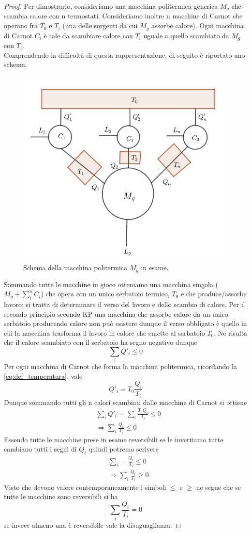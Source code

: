 \documentclass[10pt,a4paper]{article}
\newtheorem{proof}{Proposition}
\begin{document}
\begin{proof}
Per dimostrarlo, consideriamo una macchina politermica generica \(M_g\) che scambia calore con n termostati. Consideriamo inoltre n macchine di Carnot che operano fra \(T_0 \) e \(T_i\) (una delle sorgenti da cui \(M_g\) assorbe calore). Ogni macchina di Carnot \(C_i\) è tale da scambiare calore con \(T_i\) uguale a quello scambiato da \(M_g\) con \(T_i\).\\
Comprendendo la difficoltà di questa rappresentazione, di seguito è riportato uno schema.
\begin{figure}[h!]
	\centering
	\includegraphics[width=0.6\linewidth]{../images/macchina_polit}
	\caption{Schema della macchina politermica \(M_g\) in esame.}
	\label{fig:macchinapolit}
\end{figure}
\FloatBarrier
Sommando  tutte le macchine in gioco otteniamo una macchina singola (\(M_g+\sum_i^n C_i\)) che opera con un unico serbatoio termico, \(T_0\) e che produce/assorbe lavoro; si tratta di determinare il verso del lavoro e dello scambio di calore. Per il secondo principio secondo KP una macchina che assorbe calore da un unico serbatoio producendo calore non può esistere dunque il verso obbligato è quello in cui la macchina trasforma il lavoro in calore che emette al serbatoio \(T_0\). Ne risulta che il calore scambiato con il serbatoio ha segno negativo dunque 
\[\sum_i Q'_i \leq 0\]
Per ogni macchina di Carnot che forma la macchina politermica, ricordando la \ref{eq:def_temperatura}, vale 
\[Q'_i = T_0 \frac{Q_i}{T_i}\]
Dunque sommando tutti gli n calori scambiati dalle macchine di Carnot si ottiene
\begin{align*}
	&\sum_i Q'_i = \sum_i\frac{T_0 Q_i}{T_i}\leq 0\\
	&\Rightarrow \sum_i \frac{Q_i}{T_i}\leq 0
\end{align*}
Essendo tutte le macchine prese in esame reversibili se le invertiamo tutte cambiano tutti i segni di \(Q_i\) quindi potremo scrivere
\begin{align*}
	&\sum_i -\frac{Q_i}{T_i}\leq 0\\
	&\Rightarrow \sum_i \frac{Q_i}{T_i}\geq 0
\end{align*}
Visto che devono valere contemporaneamente i simboli $\leq$ e $\geq$ ne segue che se tutte le macchine sono reversibili si ha 
\[\sum_i \frac{Q_i}{T_i} = 0\]
se invece almeno una è reversibile vale la disuguaglianza.
\end{proof}
\end{document}

